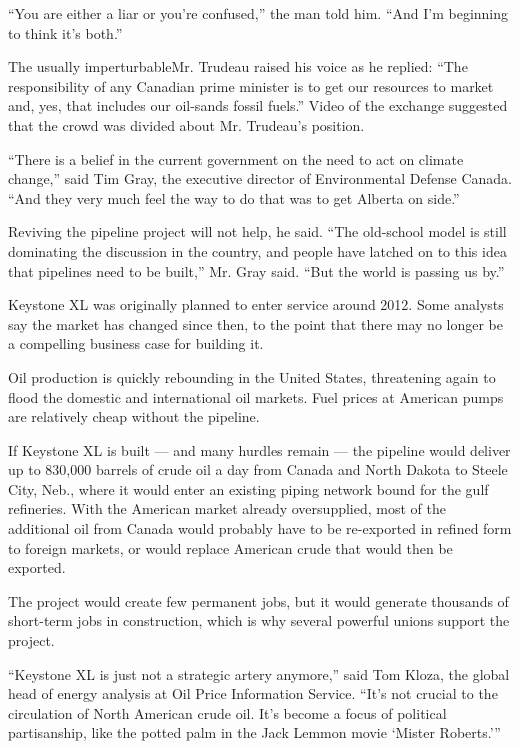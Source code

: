 ``You are either a liar or you're confused,'' the man told him. ``And
I'm beginning to think it's both.''

The usually imperturbableMr. Trudeau raised his voice as he replied:
``The responsibility of any Canadian prime minister is to get our
resources to market and, yes, that includes our oil-sands fossil
fuels.'' Video of the exchange suggested that the crowd was divided
about Mr. Trudeau's position.

``There is a belief in the current government on the need to act on
climate change,'' said Tim Gray, the executive director of Environmental
Defense Canada. ``And they very much feel the way to do that was to get
Alberta on side.''

Reviving the pipeline project will not help, he said. ``The old-school
model is still dominating the discussion in the country, and people have
latched on to this idea that pipelines need to be built,'' Mr. Gray
said. ``But the world is passing us by.''

Keystone XL was originally planned to enter service around 2012. Some
analysts say the market has changed since then, to the point that there
may no longer be a compelling business case for building it.

Oil production is quickly rebounding in the United States, threatening
again to flood the domestic and international oil markets. Fuel prices
at American pumps are relatively cheap without the pipeline.

If Keystone XL is built --- and many hurdles remain --- the pipeline
would deliver up to 830,000 barrels of crude oil a day from Canada and
North Dakota to Steele City, Neb., where it would enter an existing
piping network bound for the gulf refineries. With the American market
already oversupplied, most of the additional oil from Canada would
probably have to be re-exported in refined form to foreign markets, or
would replace American crude that would then be exported.

The project would create few permanent jobs, but it would generate
thousands of short-term jobs in construction, which is why several
powerful unions support the project.

``Keystone XL is just not a strategic artery anymore,'' said Tom Kloza,
the global head of energy analysis at Oil Price Information Service.
``It's not crucial to the circulation of North American crude oil. It's
become a focus of political partisanship, like the potted palm in the
Jack Lemmon movie `Mister Roberts.'''

